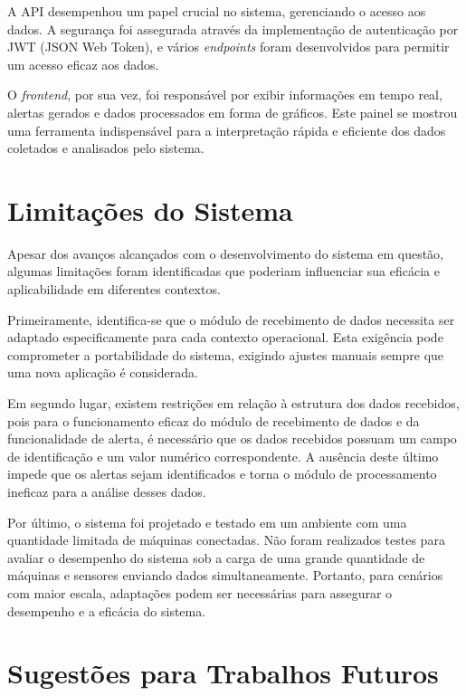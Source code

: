 A API desempenhou um papel crucial no sistema, gerenciando o acesso aos dados. A segurança foi assegurada através da implementação de autenticação por JWT (JSON Web Token), e vários \emph{endpoints} foram desenvolvidos para permitir um acesso eficaz aos dados.

O \emph{frontend}, por sua vez, foi responsável por exibir informações em tempo real, alertas gerados e dados processados em forma de gráficos. Este painel se mostrou uma ferramenta indispensável para a interpretação rápida e eficiente dos dados coletados e analisados pelo sistema.

\section{Limitações do Sistema}\label{sec:limitations}

Apesar dos avanços alcançados com o desenvolvimento do sistema em questão, algumas limitações foram identificadas que poderiam influenciar sua eficácia e aplicabilidade em diferentes contextos.

Primeiramente, identifica-se que o módulo de recebimento de dados necessita ser adaptado especificamente para cada contexto operacional. Esta exigência pode comprometer a portabilidade do sistema, exigindo ajustes manuais sempre que uma nova aplicação é considerada.

Em segundo lugar, existem restrições em relação à estrutura dos dados recebidos, pois para o funcionamento eficaz do módulo de recebimento de dados e da funcionalidade de alerta, é necessário que os dados recebidos possuam um campo de identificação e um valor numérico correspondente. A ausência deste último impede que os alertas sejam identificados e torna o módulo de processamento ineficaz para a análise desses dados.

Por último, o sistema foi projetado e testado em um ambiente com uma quantidade limitada de máquinas conectadas. Não foram realizados testes para avaliar o desempenho do sistema sob a carga de uma grande quantidade de máquinas e sensores enviando dados simultaneamente. Portanto, para cenários com maior escala, adaptações podem ser necessárias para assegurar o desempenho e a eficácia do sistema.


\section{Sugestões para Trabalhos Futuros}\label{sec:future_work}

